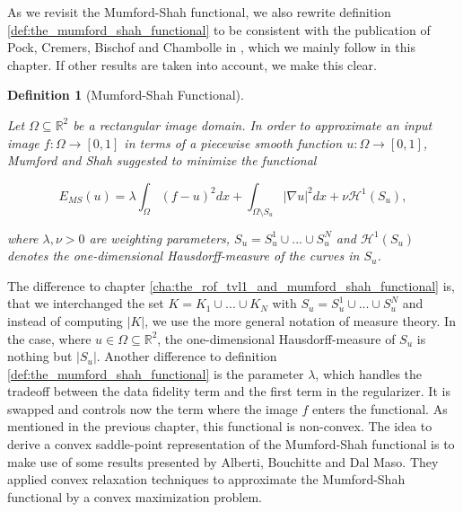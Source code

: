 \documentclass{scrreprt}
\newtheorem{definition}[theorem]{Definition}
\begin{document}
    As we revisit the Mumford-Shah functional, we also rewrite definition \ref{def:the_mumford_shah_functional} to be consistent with the publication of Pock, Cremers, Bischof and Chambolle in \cite{Pock-et-al-iccv09}, which we mainly follow in this chapter. If other results are taken into account, we make this clear.

    \begin{definition}[Mumford-Shah Functional] %
    \label{def:the_mumford_shah_functional_revisited}

        Let $\Omega \subseteq \mathbb{R}^{2}$ be a rectangular image domain. In order to approximate an input image $f: \Omega \longrightarrow [0, 1]$ in terms of a piecewise smooth function $u: \Omega \longrightarrow [0, 1]$, Mumford and Shah suggested to minimize the functional
            
            \begin{equation}
                E_{MS}(u) = \lambda \int_{\Omega} (f - u)^{2} dx + \int_{\Omega \setminus S_{u}} |\nabla u|^{2} dx + \nu \mathcal{H}^{1}(S_{u}),
            \label{eq:the_mumford_shah_functional_revisited}
            \end{equation}
        
        where $\lambda, \nu > 0$ are weighting parameters, $S_{u} = S^{1}_{u} \cup ... \cup S^{N}_{u}$ and $\mathcal{H}^{1}(S_{u})$ denotes the one-dimensional Hausdorff-measure of the curves in $S_{u}$.

    \end{definition}

    The difference to chapter \ref{cha:the_rof_tvl1_and_mumford_shah_functional} is, that we interchanged the set $K = K_{1} \cup ... \cup K_{N}$ with $S_{u} = S^{1}_{u} \cup ... \cup S^{N}_{u}$ and instead of computing $|K|$, we use the more general notation of measure theory. In the case, where $u \in \Omega \subseteq \mathbb{R}^{2}$, the one-dimensional Hausdorff-measure of $S_{u}$ is nothing but $|S_{u}|$. Another difference to definition \ref{def:the_mumford_shah_functional} is the parameter $\lambda$, which handles the tradeoff between the data fidelity term and the first term in the regularizer. It is swapped and controls now the term where the image $f$ enters the functional. As mentioned in the previous chapter, this functional is non-convex. The idea to derive a convex saddle-point representation of the Mumford-Shah functional is to make use of some results presented by Alberti, Bouchitte and Dal Maso. They applied convex relaxation techniques to approximate the Mumford-Shah functional by a convex maximization problem.
\end{document}
